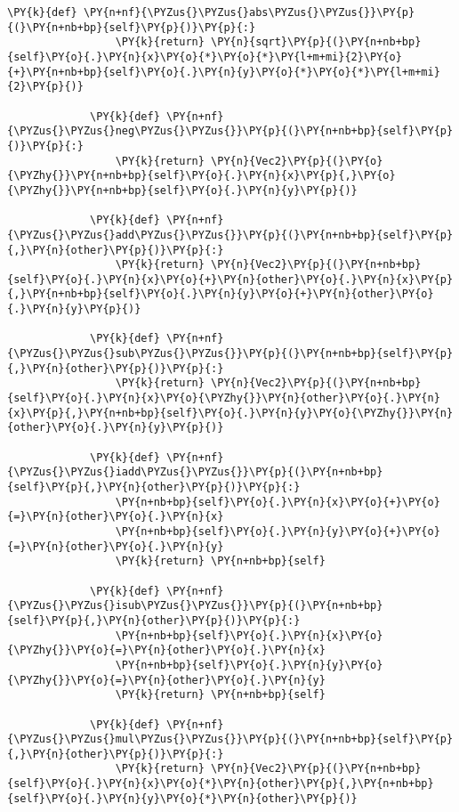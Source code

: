 \begin{Verbatim}[commandchars=\\\{\}]
             \PY{k}{def} \PY{n+nf}{\PYZus{}\PYZus{}abs\PYZus{}\PYZus{}}\PY{p}{(}\PY{n+nb+bp}{self}\PY{p}{)}\PY{p}{:}
                 \PY{k}{return} \PY{n}{sqrt}\PY{p}{(}\PY{n+nb+bp}{self}\PY{o}{.}\PY{n}{x}\PY{o}{*}\PY{o}{*}\PY{l+m+mi}{2}\PY{o}{+}\PY{n+nb+bp}{self}\PY{o}{.}\PY{n}{y}\PY{o}{*}\PY{o}{*}\PY{l+m+mi}{2}\PY{p}{)}
             
             \PY{k}{def} \PY{n+nf}{\PYZus{}\PYZus{}neg\PYZus{}\PYZus{}}\PY{p}{(}\PY{n+nb+bp}{self}\PY{p}{)}\PY{p}{:}
                 \PY{k}{return} \PY{n}{Vec2}\PY{p}{(}\PY{o}{\PYZhy{}}\PY{n+nb+bp}{self}\PY{o}{.}\PY{n}{x}\PY{p}{,}\PY{o}{\PYZhy{}}\PY{n+nb+bp}{self}\PY{o}{.}\PY{n}{y}\PY{p}{)}
             
             \PY{k}{def} \PY{n+nf}{\PYZus{}\PYZus{}add\PYZus{}\PYZus{}}\PY{p}{(}\PY{n+nb+bp}{self}\PY{p}{,}\PY{n}{other}\PY{p}{)}\PY{p}{:}
                 \PY{k}{return} \PY{n}{Vec2}\PY{p}{(}\PY{n+nb+bp}{self}\PY{o}{.}\PY{n}{x}\PY{o}{+}\PY{n}{other}\PY{o}{.}\PY{n}{x}\PY{p}{,}\PY{n+nb+bp}{self}\PY{o}{.}\PY{n}{y}\PY{o}{+}\PY{n}{other}\PY{o}{.}\PY{n}{y}\PY{p}{)}
             
             \PY{k}{def} \PY{n+nf}{\PYZus{}\PYZus{}sub\PYZus{}\PYZus{}}\PY{p}{(}\PY{n+nb+bp}{self}\PY{p}{,}\PY{n}{other}\PY{p}{)}\PY{p}{:}
                 \PY{k}{return} \PY{n}{Vec2}\PY{p}{(}\PY{n+nb+bp}{self}\PY{o}{.}\PY{n}{x}\PY{o}{\PYZhy{}}\PY{n}{other}\PY{o}{.}\PY{n}{x}\PY{p}{,}\PY{n+nb+bp}{self}\PY{o}{.}\PY{n}{y}\PY{o}{\PYZhy{}}\PY{n}{other}\PY{o}{.}\PY{n}{y}\PY{p}{)}
             
             \PY{k}{def} \PY{n+nf}{\PYZus{}\PYZus{}iadd\PYZus{}\PYZus{}}\PY{p}{(}\PY{n+nb+bp}{self}\PY{p}{,}\PY{n}{other}\PY{p}{)}\PY{p}{:}
                 \PY{n+nb+bp}{self}\PY{o}{.}\PY{n}{x}\PY{o}{+}\PY{o}{=}\PY{n}{other}\PY{o}{.}\PY{n}{x}
                 \PY{n+nb+bp}{self}\PY{o}{.}\PY{n}{y}\PY{o}{+}\PY{o}{=}\PY{n}{other}\PY{o}{.}\PY{n}{y}
                 \PY{k}{return} \PY{n+nb+bp}{self}
             
             \PY{k}{def} \PY{n+nf}{\PYZus{}\PYZus{}isub\PYZus{}\PYZus{}}\PY{p}{(}\PY{n+nb+bp}{self}\PY{p}{,}\PY{n}{other}\PY{p}{)}\PY{p}{:}
                 \PY{n+nb+bp}{self}\PY{o}{.}\PY{n}{x}\PY{o}{\PYZhy{}}\PY{o}{=}\PY{n}{other}\PY{o}{.}\PY{n}{x}
                 \PY{n+nb+bp}{self}\PY{o}{.}\PY{n}{y}\PY{o}{\PYZhy{}}\PY{o}{=}\PY{n}{other}\PY{o}{.}\PY{n}{y}
                 \PY{k}{return} \PY{n+nb+bp}{self}
             
             \PY{k}{def} \PY{n+nf}{\PYZus{}\PYZus{}mul\PYZus{}\PYZus{}}\PY{p}{(}\PY{n+nb+bp}{self}\PY{p}{,}\PY{n}{other}\PY{p}{)}\PY{p}{:}
                 \PY{k}{return} \PY{n}{Vec2}\PY{p}{(}\PY{n+nb+bp}{self}\PY{o}{.}\PY{n}{x}\PY{o}{*}\PY{n}{other}\PY{p}{,}\PY{n+nb+bp}{self}\PY{o}{.}\PY{n}{y}\PY{o}{*}\PY{n}{other}\PY{p}{)}
             

\end{Verbatim}
